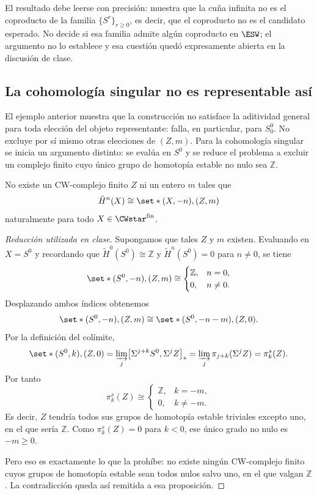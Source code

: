 \begin{nota}
   El resultado debe leerse con precisión: muestra que la cuña infinita no es el coproducto de la familia $\{S^r\}_{r\ge0}$, es decir, que el coproducto no es el candidato esperado. No decide si esa familia admite algún coproducto en $\ESW$; el argumento no lo establece y esa cuestión quedó expresamente abierta en la discusión de clase.
\end{nota}

\subsection{La cohomología singular no es representable así}

El ejemplo anterior muestra que la construcción no satisface la aditividad general para toda elección del objeto representante: falla, en particular, para $S^0_0$. No excluye por sí mismo otras elecciones de $(Z,m)$. Para la cohomología singular se inicia un argumento distinto: se evalúa en $S^0$ y se reduce el problema a excluir un complejo finito cuyo único grupo de homotopía estable no nulo sea $\mathbb Z$.

\begin{teo}\label{teo:no-representable}
No existe un CW-complejo finito $Z$ ni un entero $m$ tales que
\[
\tilde H^n(X)\cong\set*{(X,-n),(Z,m)}
\]
naturalmente para todo $X\in\CWstar^{\mathrm{fin}}$.
\end{teo}
\begin{proof}[Reducción utilizada en clase]
Supongamos que tales $Z$ y $m$ existen. Evaluando en $X=S^0$ y recordando que $\tilde H^0(S^0)\cong\mathbb Z$ y $\tilde H^n(S^0)=0$ para $n\neq0$, se tiene
\[
\set*{(S^0,-n),(Z,m)}\cong
\begin{cases}
\mathbb Z, & n=0,\\
0, & n\neq0 .
\end{cases}
\]
Desplazando ambos índices obtenemos
\[
\set*{(S^0,-n),(Z,m)}\cong\set*{(S^0,-n-m),(Z,0)}.
\]
Por la definición del colímite,
\[
\set*{(S^0,k),(Z,0)}=\varinjlim_j\bigl[\Sigma^{j+k}S^0,\Sigma^jZ\bigr]_*=\varinjlim_j\pi_{j+k}(\Sigma^jZ)=\pi^s_k(Z).
\]
Por tanto
\[
\pi^s_k(Z)\cong
\begin{cases}
\mathbb Z, & k=-m,\\
0, & k\neq-m .
\end{cases}
\]
Es decir, $Z$ tendría todos sus grupos de homotopía estable triviales excepto uno, en el que sería $\mathbb Z$. Como $\pi^s_k(Z)=0$ para $k<0$, ese único grado no nulo es $-m\ge0$.

Pero eso es exactamente lo que la  prohíbe: no existe ningún CW-complejo finito cuyos grupos de homotopía estable sean todos nulos salvo uno, en el que valgan $\mathbb Z$. La contradicción queda así remitida a esa proposición.
\end{proof}

